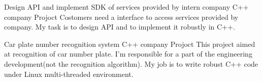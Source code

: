 \documentclass[11pt,a4paper]{moderncv}
\begin{document}

\vspace*{0.2\baselineskip}
{Design API and implement SDK of services provided by intern company}
{C++}
{company Projoct}
{}
{
Costomers need a interface to access services provided by company. My task is to design API and to implement it robustly in C++.\\
}

\vspace*{0.2\baselineskip}
{Car plate number recognition system}
{C++}
{company Projoct}
{}
{
    This project aimed at recognition of car number plate. I'm responsible for a part of the engineering development(not the recognition algorithm). My job is to write robust C++ code under Linux multi-threaded environment. \\
}
%
%
\end{document}
